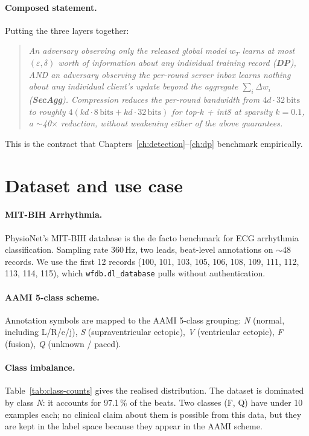 \documentclass[11pt,a4paper]{report}
\begin{document}
\paragraph{Composed statement.} Putting the three layers together:

\begin{quote}\itshape
  An adversary observing only the released global model $w_T$ learns at
  most $(\varepsilon, \delta)$ worth of information about any individual
  training record (\textbf{DP}), AND an adversary observing the per-round
  server inbox learns nothing about any individual client's update beyond
  the aggregate $\sum_i \Delta w_i$ (\textbf{SecAgg}). Compression reduces
  the per-round bandwidth from $4d \cdot 32\,\mathrm{bits}$ to roughly
  $4(k d \cdot 8\,\mathrm{bits} + k d \cdot 32\,\mathrm{bits})$ for
  top-$k$ + int8 at sparsity $k = 0.1$, a $\sim$40$\times$ reduction,
  without weakening either of the above guarantees.
\end{quote}

This is the contract that Chapters~\ref{ch:detection}--\ref{ch:dp}
benchmark empirically.

\section{Dataset and use case}

\paragraph{MIT-BIH Arrhythmia.}
PhysioNet's MIT-BIH database \cite{moody2001mitbih} is the de facto benchmark
for ECG arrhythmia classification. Sampling rate 360\,Hz, two leads,
beat-level annotations on $\sim$48 records. We use the first 12 records (100,
101, 103, 105, 106, 108, 109, 111, 112, 113, 114, 115), which
\texttt{wfdb.dl\_database} pulls without authentication.

\paragraph{AAMI 5-class scheme.}
Annotation symbols are mapped to the AAMI \cite{aami1998ec57} 5-class
grouping: \emph{N} (normal, including L/R/e/j), \emph{S} (supraventricular
ectopic), \emph{V} (ventricular ectopic), \emph{F} (fusion), \emph{Q}
(unknown / paced).

\paragraph{Class imbalance.}
Table~\ref{tab:class-counts} gives the realised distribution. The dataset
is dominated by class \emph{N}: it accounts for 97.1\,\% of the beats. Two
classes (F, Q) have under 10 examples each; no clinical claim about them is
possible from this data, but they are kept in the label space because they
appear in the AAMI scheme.
\end{document}
